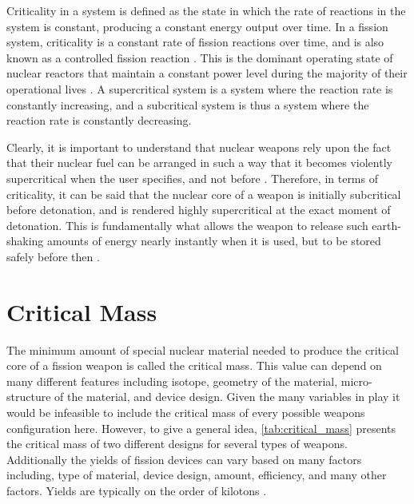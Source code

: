 \documentclass{report}
\begin{document}
Criticality in a system is defined as the state in which the rate of reactions in the system is constant, producing a constant energy output over time. In a fission system, criticality is a constant rate of fission reactions over time, and is also known as a controlled fission reaction \cite{Duderstadt1976}. This is the dominant operating state of nuclear reactors that maintain a constant power level during the majority of their operational lives \cite{Ott1983}. A supercritical system is a system where the reaction rate is constantly increasing, and a subcritical system is thus a system where the reaction rate is constantly decreasing. 

Clearly, it is important to understand that nuclear weapons rely upon the fact that their nuclear fuel can be arranged in such a way that it becomes violently supercritical when the user specifies, and not before \cite{Lewis2008}. Therefore, in terms of criticality, it can be said that the nuclear core of a weapon is initially subcritical before detonation, and  is rendered highly supercritical at the exact moment of detonation. This is fundamentally what allows the weapon to release such earth-shaking amounts of energy nearly instantly when it is used, but to be stored safely before then \cite{Prussin2014,Defense1998}. 


\section{Critical Mass}

The minimum amount of special nuclear material needed to produce the critical core of a  fission weapon is called the critical mass. This value can depend on many different features including isotope, geometry of the material, micro-structure of the material, and device design. Given the many variables in play it would be infeasible to include the critical mass of every possible weapons configuration here. However, to give a general idea, \autoref{tab:critical_mass} presents the critical mass of two different designs for several types of weapons. Additionally the yields of fission devices can vary based on many factors including, type of material, device design, amount, efficiency, and many other factors. Yields are typically on the order of kilotons \cite{Moody2014}. 
\end{document}
